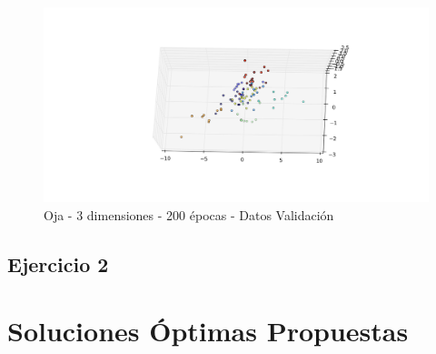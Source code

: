 \begin{figure}[h]
  \begin{center}
    \includegraphics[scale=0.6]{../img/ej1/oja/alt-oja_3salida_200ep_validation_3.png}
  \caption{Oja - 3 dimensiones - 200 épocas - Datos Validación}
  \end{center}
\end{figure}

\newpage
\subsection{Ejercicio 2}

\newpage
\section{Soluciones Óptimas Propuestas}


